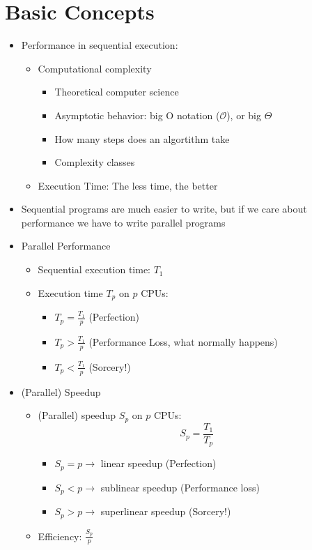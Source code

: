 \documentclass[a4paper]{article}
\begin{document}
\section{Basic Concepts}
\begin{itemize}
\item Performance in sequential execution:
\begin{itemize}
\item Computational complexity
\begin{itemize}
\item Theoretical computer science
\item Asymptotic behavior: big O notation ($\mathcal{O}$), or big $\Theta$
\item How many steps does an algortithm take
\item Complexity classes
\end{itemize}
\item Execution Time: The less time, the better
\end{itemize}
\item Sequential programs are much easier to write, but if we care about performance we have to write parallel programs
\item Parallel Performance
\begin{itemize}
\item Sequential execution time: $T_1$
\item Execution time $T_p$ on $p$ CPUs:
\begin{itemize}
\item $T_p=\frac{T_1}{p}$ (Perfection)
\item $T_p>\frac{T_1}{p}$ (Performance Loss, what normally happens)
\item $T_p<\frac{T_1}{p}$ (Sorcery!)
\end{itemize}
\end{itemize}
\item (Parallel) Speedup
\begin{itemize}
\item (Parallel) speedup $S_p$ on $p$ CPUs: \[S_p=\frac{T_1}{T_p}\]
\begin{itemize}
\item $S_p=p\to$ linear speedup (Perfection)
\item $S_p<p\to$ sublinear speedup (Performance loss)
\item $S_p>p\to$ superlinear speedup (Sorcery!)
\end{itemize}
\item Efficiency: $\frac{S_p}{p}$
\end{itemize}

\end{itemize}
\end{document}

